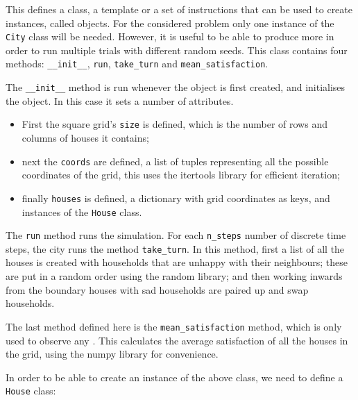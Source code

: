 This defines a class, a template or a set of instructions that can be used to
create instances, called objects.
For the considered problem only one instance of the \texttt{City}
class will be needed.
However, it is useful to be able to produce more in order to run multiple trials
with different random seeds.
This class contains four methods: \texttt{__init__},
\texttt{run}, \texttt{take_turn} and
\texttt{mean_satisfaction}.

The \texttt{__init__} method is run whenever the object is first
created, and initialises the object.
In this case it sets a number of attributes.

\begin{itemize}
     \item First the square grid's \texttt{size} is defined, which
           is the number of rows and columns of houses it contains;
     \item next the \texttt{coords} are defined, a list of tuples
           representing all the possible coordinates of the grid, this uses the
           itertools library for efficient iteration;
     \item finally \texttt{houses} is defined, a dictionary with
           grid coordinates as keys, and instances of the
           \texttt{House} class.
\end{itemize}


The \texttt{run} method runs the simulation. For each
\texttt{n_steps} number of discrete time steps, the city runs the
method \texttt{take_turn}.
In this method, first a list of all the houses is created with households that
are unhappy with their neighbours; these are put in a random order using the
random library; and then working inwards from the boundary
houses with sad households are paired up and swap households.

The last method defined here is the \texttt{mean_satisfaction}
method, which is only used to observe any .
This calculates the average satisfaction of all the houses in the grid, using
the numpy library for convenience.

In order to be able to create an instance of the above class, we need to define
a \texttt{House} class:

